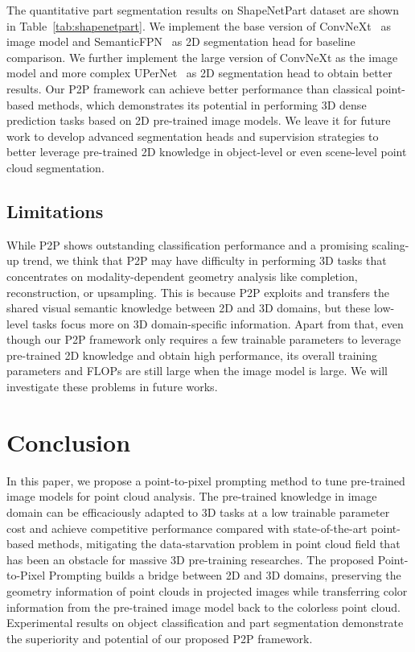 \documentclass{article}
\begin{document}
The quantitative part segmentation results on ShapeNetPart dataset are shown in Table~\ref{tab:shapenetpart}. We implement the base version of ConvNeXt~\cite{liu2022convnext} as image model and SemanticFPN~\cite{kirillov2019semanticfpn} as 2D segmentation head for baseline comparison. We further implement the large version of ConvNeXt as the image model and more complex UPerNet~\cite{xiao2018uper} as 2D segmentation head to obtain better results.  Our P2P framework can achieve better performance than classical point-based methods, which demonstrates its potential in performing 3D dense prediction tasks based on 2D pre-trained image models. We leave it for future work to develop advanced segmentation heads and supervision strategies to better leverage pre-trained 2D knowledge in object-level or even scene-level point cloud segmentation. 

\subsection{Limitations}

While P2P shows outstanding classification performance and a promising scaling-up trend, we think that P2P may have difficulty in performing 3D tasks that concentrates on modality-dependent geometry analysis like completion, reconstruction, or upsampling. This is because P2P exploits and transfers the shared visual semantic knowledge between 2D and 3D domains, but these low-level tasks focus more on 3D domain-specific information. Apart from that, even though our P2P framework only requires a few trainable parameters to leverage pre-trained 2D knowledge and obtain high performance, its overall training parameters and FLOPs are still large when the image model is large. We will investigate these problems in future works.

\section{Conclusion}

In this paper, we propose a point-to-pixel prompting method to tune pre-trained image models for point cloud analysis. The pre-trained knowledge in image domain can be efficaciously adapted to 3D tasks at a low trainable parameter cost and achieve competitive performance compared with state-of-the-art point-based methods, mitigating the data-starvation problem in point cloud field that has been an obstacle for massive 3D pre-training researches.  The proposed Point-to-Pixel Prompting builds a bridge between 2D and 3D domains, preserving the geometry information of point clouds in projected images while transferring color information from the pre-trained image model back to the colorless point cloud. Experimental results on object classification and part segmentation demonstrate the superiority and potential of our proposed P2P framework.
\end{document}

